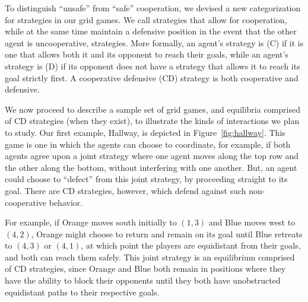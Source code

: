 To distinguish ``unsafe'' from ``safe'' cooperation, we devised a new
categorization for strategies in our grid games.  We call strategies
that allow for cooperation, while at the same time maintain a
defensive position in the event that the other agent is uncooperative,
 strategies.  More formally, an agent's
strategy is  (C) if it is one that allows both it
and its opponent to reach their goals, while an agent's strategy is
 (D) if its opponent does not have a strategy that
allows it to reach its goal strictly first.  A cooperative defensive
(CD) strategy is both cooperative and defensive.

We now proceed to describe a sample set of grid games, and equilibria
comprised of CD strategies (when they exist), to illustrate the kinds
of interactions we plan to study.
%
Our first example, Hallway, is depicted in Figure~\ref{fig:hallway}.
This game is one in which the agents can choose to coordinate, for
example, if both agents agree upon a joint strategy where one agent
moves along the top row and the other along the bottom, without
interfering with one another.  But, an agent could choose to ``defect''
from this joint strategy, by proceeding straight to its goal.  There
are CD strategies, however, which defend against such non-cooperative
behavior.

For example, if Orange moves south initially to $(1,3)$ and Blue moves
west to $(4,2)$, Orange might choose to return and remain on its goal
until Blue retreats to $(4,3)$ or $(4,1)$, at which point the players
are equidistant from their goals, and both can reach them safely.
This joint strategy is an equilibrium comprised of CD strategies,
since Orange and Blue both remain in positions where they have the
ability to block their opponents until they both have unobstructed
equidistant paths to their respective goals.


